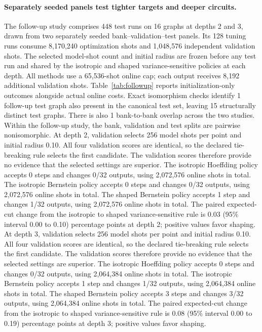 \paragraph{Separately seeded panels test tighter targets and deeper circuits.}
The follow-up study comprises 448 test runs on 16 graphs at depths 2 and 3, drawn from two separately seeded bank--validation--test panels. Its 128 tuning runs consume 8,170,240 optimization shots and 1,048,576 independent validation shots. The selected model-shot count and initial radius are frozen before any test run and shared by the isotropic and shaped variance-sensitive policies at each depth. All methods use a 65,536-shot online cap; each output receives 8,192 additional validation shots. Table~\ref{tab:followup} reports initialization-only outcomes alongside actual online costs.
Exact isomorphism checks identify 1 follow-up test graph also present in the canonical test set, leaving 15 structurally distinct test graphs. There is also 1 bank-to-bank overlap across the two studies. Within the follow-up study, the bank, validation and test splits are pairwise nonisomorphic.
At depth 2, validation selects 256 model shots per point and initial radius 0.10.
All four validation scores are identical, so the declared tie-breaking rule selects the first candidate. The validation scores therefore provide no evidence that the selected settings are superior.
The isotropic Hoeffding policy accepts 0 steps and changes 0/32 outputs, using 2,072,576 online shots in total.
The isotropic Bernstein policy accepts 0 steps and changes 0/32 outputs, using 2,072,576 online shots in total.
The shaped Bernstein policy accepts 1 step and changes 1/32 outputs, using 2,072,576 online shots in total.
The paired expected-cut change from the isotropic to shaped variance-sensitive rule is 0.03 (95\% interval 0.00 to 0.10) percentage points at depth 2; positive values favor shaping.
At depth 3, validation selects 256 model shots per point and initial radius 0.10.
All four validation scores are identical, so the declared tie-breaking rule selects the first candidate. The validation scores therefore provide no evidence that the selected settings are superior.
The isotropic Hoeffding policy accepts 0 steps and changes 0/32 outputs, using 2,064,384 online shots in total.
The isotropic Bernstein policy accepts 1 step and changes 1/32 outputs, using 2,064,384 online shots in total.
The shaped Bernstein policy accepts 3 steps and changes 3/32 outputs, using 2,064,384 online shots in total.
The paired expected-cut change from the isotropic to shaped variance-sensitive rule is 0.08 (95\% interval 0.00 to 0.19) percentage points at depth 3; positive values favor shaping.
